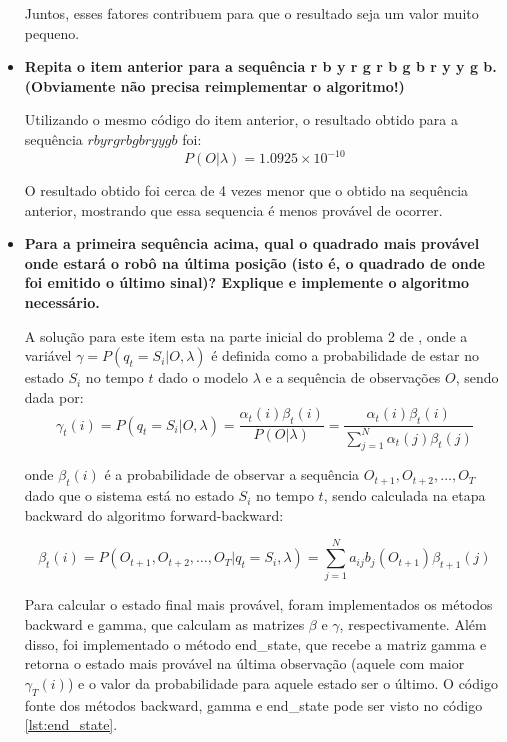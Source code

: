 \begin{itemize}
\begin{tcolorbox}[title=Resposta (continuação):]
        Juntos, esses fatores contribuem para que o resultado seja um valor muito pequeno.
    \end{tcolorbox}

    \item \textbf{Repita o item anterior para a sequência r b y r g r b g b r y y g b. (Obviamente não precisa reimplementar o algoritmo!)}
    \begin{tcolorbox}[title=Resposta:]
        Utilizando o mesmo código do item anterior, o resultado obtido para a sequência \( r b y r g r b g b r y y g b \) foi:
        \begin{equation}
            P(O |  \lambda) = 1.0925 \times 10^{-10}
        \end{equation}

        O resultado obtido foi cerca de 4 vezes menor que o obtido na sequência anterior, mostrando que essa sequencia é menos provável de ocorrer.
    \end{tcolorbox}

    \item \textbf{Para a primeira sequência acima, qual o quadrado mais provável onde estará o robô na última posição (isto é, o quadrado de onde foi emitido o último sinal)? Explique e implemente o algoritmo necessário.}
    \begin{tcolorbox}[title=Resposta:]
        A solução para este item esta na parte inicial do problema 2 de \cite{Rabiner1989}, onde a variável $\gamma = P (q_t = S_i | O, \lambda)$ é definida como a probabilidade de estar no estado $S_i$ no tempo $t$ dado o modelo $\lambda$ e a sequência de observações $O$, sendo dada por:
        \begin{equation}
            \gamma_t(i) = P(q_t = S_i | O, \lambda) = \frac{\alpha_t(i) \beta_t(i)}{P(O | \lambda)} = \frac{\alpha_t(i) \beta_t(i)}{\sum_{j=1}^{N} \alpha_t(j) \beta_t(j)}
        \end{equation}

        onde $\beta_t(i)$ é a probabilidade de observar a sequência $O_{t+1}, O_{t+2}, \ldots, O_T$ dado que o sistema está no estado $S_i$ no tempo $t$, sendo calculada na etapa backward do algoritmo forward-backward:

        \begin{equation}
            \beta_t(i) = P(O_{t+1}, O_{t+2}, \ldots, O_T | q_t = S_i, \lambda) = \sum_{j=1}^{N} a_{ij} b_j(O_{t+1}) \beta_{t+1}(j)
        \end{equation}

        Para calcular o estado final mais provável, foram implementados os métodos backward e gamma, que calculam as matrizes $\beta$ e $\gamma$, respectivamente. Além disso, foi implementado o método end\_state, que recebe a matriz gamma e retorna o estado mais provável na última observação (aquele com maior $\gamma_T(i)$) e o valor da probabilidade para aquele estado ser o último. O código fonte dos métodos backward, gamma e end\_state pode ser visto no código \ref{lst:end_state}.


\end{tcolorbox}
\end{itemize}
